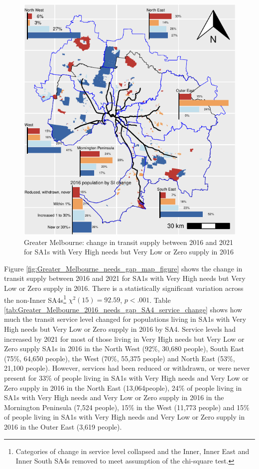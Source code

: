 \documentclass[preprint, 3p,
authoryear]{elsarticle} %
\begin{document}
\begin{figure}
\includegraphics[width=1\linewidth]{ReynoldsCurrieQu2024_files/figure-latex/Greater_Melbourne_2016_needs_gap_SA4_service_change-1} \caption{Greater Melbourne: change in transit supply between 2016 and 2021 for SA1s with Very High needs but Very Low or Zero supply in 2016}\label{fig:Greater_Melbourne_2016_needs_gap_SA4_service_change}
\end{figure}

Figure \ref{fig:Greater_Melbourne_needs_gap_map_figure} shows the change
in transit supply between 2016 and 2021 for SA1s with Very High needs
but Very Low or Zero supply in 2016. There is a statistically
significant variation across the non-Inner SA4s\footnote{Categories of
  change in service level collapsed and the Inner, Inner East and Inner
  South SA4s removed to meet assumption of the chi-square test.}
\(\chi^2(15) = 92.59\), \(p < .001\). Table
\ref{tab:Greater_Melbourne_2016_needs_gap_SA4_service_change} shows how
much the transit service level changed for populations living in SA1s
with Very High needs but Very Low or Zero supply in 2016 by SA4. Service
levels had increased by 2021 for most of those living in Very High needs
but Very Low or Zero supply SA1s in 2016 in the North West (92\%, 30,680
people), South East (75\%, 64,650 people), the West (70\%, 55,375
people) and North East (53\%, 21,100 people). However, services had been
reduced or withdrawn, or were never present for 33\% of people living in
SA1s with Very High needs and Very Low or Zero supply in 2016 in the
North East (13,064people), 24\% of people living in SA1s with Very High
needs and Very Low or Zero supply in 2016 in the Mornington Peninsula
(7,524 people), 15\% in the West (11,773 people) and 15\% of people
living in SA1s with Very High needs and Very Low or Zero supply in 2016
in the Outer East (3,619 people).
\end{document}
